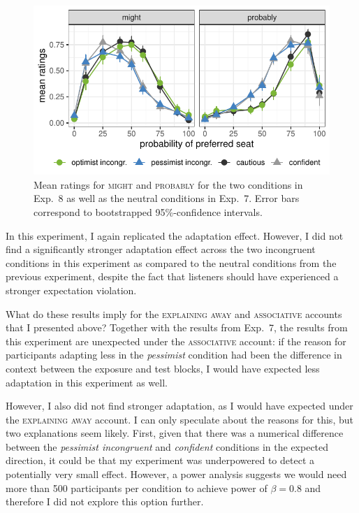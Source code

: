 \begin{figure}[t]
    \centering
    \includegraphics[width=.75\columnwidth, trim={0 0.75cm 0 0cm}]{./plots/incongruent.pdf}
    \caption{Mean ratings for \textsc{might} and \textsc{probably} for the two conditions in Exp.~8 as well as the neutral conditions in Exp.~7. Error bars correspond to bootstrapped 95\%-confidence intervals.}
    \label{fig:results-exp8}
\end{figure}

In this experiment, I again replicated the adaptation effect. However, I did not find a significantly stronger adaptation effect across the two incongruent conditions in this experiment as compared to the neutral conditions from the previous experiment, despite the fact that listeners should have experienced a stronger expectation violation.

What do these results imply for the \textsc{explaining away} and \textsc{associative} accounts that I presented above? Together with the results from Exp.~7, the results from this experiment are unexpected under the \textsc{associative} account: if the reason for participants adapting less in the \textit{pessimist} condition had been the difference in context between the exposure and test blocks, I would have expected less adaptation in this experiment as well.

However, I also did not find stronger adaptation, as I would have expected under the \textsc{explaining away} account. I can only speculate about the reasons for this, but two explanations seem likely. First, given that there was a numerical difference between the \textit{pessimist incongruent} and \textit{confident} conditions in the expected direction, it could be that my experiment was underpowered to detect a potentially very small effect. However, a power analysis suggests we would need more than 500 participants per condition to achieve power of $\beta=0.8$ and therefore I did not explore this option further.


